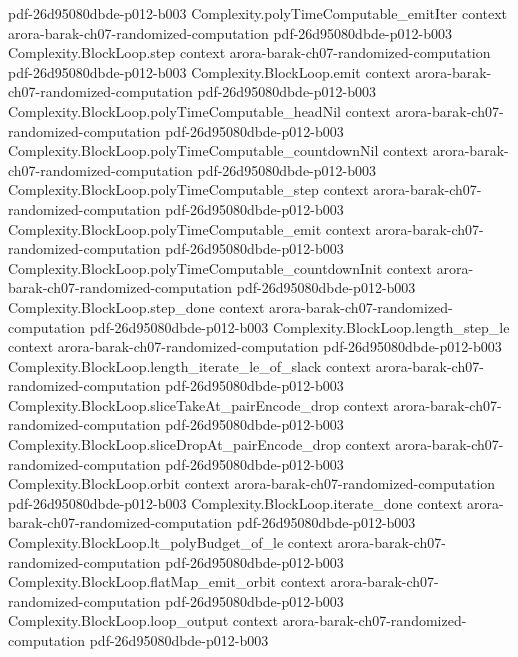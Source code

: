 \begin{theorem}
  {pdf-26d95080dbde-p012-b003}
\proofstep
  {Complexity.polyTimeComputable_emitIter}
  {context}
  {arora-barak-ch07-randomized-computation}
  {pdf-26d95080dbde-p012-b003}
\proofstep
  {Complexity.BlockLoop.step}
  {context}
  {arora-barak-ch07-randomized-computation}
  {pdf-26d95080dbde-p012-b003}
\proofstep
  {Complexity.BlockLoop.emit}
  {context}
  {arora-barak-ch07-randomized-computation}
  {pdf-26d95080dbde-p012-b003}
\proofstep
  {Complexity.BlockLoop.polyTimeComputable_headNil}
  {context}
  {arora-barak-ch07-randomized-computation}
  {pdf-26d95080dbde-p012-b003}
\proofstep
  {Complexity.BlockLoop.polyTimeComputable_countdownNil}
  {context}
  {arora-barak-ch07-randomized-computation}
  {pdf-26d95080dbde-p012-b003}
\proofstep
  {Complexity.BlockLoop.polyTimeComputable_step}
  {context}
  {arora-barak-ch07-randomized-computation}
  {pdf-26d95080dbde-p012-b003}
\proofstep
  {Complexity.BlockLoop.polyTimeComputable_emit}
  {context}
  {arora-barak-ch07-randomized-computation}
  {pdf-26d95080dbde-p012-b003}
\proofstep
  {Complexity.BlockLoop.polyTimeComputable_countdownInit}
  {context}
  {arora-barak-ch07-randomized-computation}
  {pdf-26d95080dbde-p012-b003}
\proofstep
  {Complexity.BlockLoop.step_done}
  {context}
  {arora-barak-ch07-randomized-computation}
  {pdf-26d95080dbde-p012-b003}
\proofstep
  {Complexity.BlockLoop.length_step_le}
  {context}
  {arora-barak-ch07-randomized-computation}
  {pdf-26d95080dbde-p012-b003}
\proofstep
  {Complexity.BlockLoop.length_iterate_le_of_slack}
  {context}
  {arora-barak-ch07-randomized-computation}
  {pdf-26d95080dbde-p012-b003}
\proofstep
  {Complexity.BlockLoop.sliceTakeAt_pairEncode_drop}
  {context}
  {arora-barak-ch07-randomized-computation}
  {pdf-26d95080dbde-p012-b003}
\proofstep
  {Complexity.BlockLoop.sliceDropAt_pairEncode_drop}
  {context}
  {arora-barak-ch07-randomized-computation}
  {pdf-26d95080dbde-p012-b003}
\proofstep
  {Complexity.BlockLoop.orbit}
  {context}
  {arora-barak-ch07-randomized-computation}
  {pdf-26d95080dbde-p012-b003}
\proofstep
  {Complexity.BlockLoop.iterate_done}
  {context}
  {arora-barak-ch07-randomized-computation}
  {pdf-26d95080dbde-p012-b003}
\proofstep
  {Complexity.BlockLoop.lt_polyBudget_of_le}
  {context}
  {arora-barak-ch07-randomized-computation}
  {pdf-26d95080dbde-p012-b003}
\proofstep
  {Complexity.BlockLoop.flatMap_emit_orbit}
  {context}
  {arora-barak-ch07-randomized-computation}
  {pdf-26d95080dbde-p012-b003}
\proofstep
  {Complexity.BlockLoop.loop_output}
  {context}
  {arora-barak-ch07-randomized-computation}
  {pdf-26d95080dbde-p012-b003}
\proofstep

\end{theorem}
